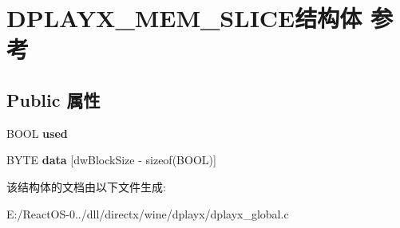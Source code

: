 \hypertarget{struct_d_p_l_a_y_x___m_e_m___s_l_i_c_e}{}\section{D\+P\+L\+A\+Y\+X\+\_\+\+M\+E\+M\+\_\+\+S\+L\+I\+C\+E结构体 参考}
\label{struct_d_p_l_a_y_x___m_e_m___s_l_i_c_e}
\subsection*{Public 属性}
\begin{DoxyCompactItemize}
\item 
\mbox{\label{struct_d_p_l_a_y_x___m_e_m___s_l_i_c_e_acb4ccc1af3c434f08655496d4c706907}} 
B\+O\+OL {\bfseries used}
\item 
\mbox{\label{struct_d_p_l_a_y_x___m_e_m___s_l_i_c_e_a71a609c6d62efcb2426b8821a2e01ed6}} 
B\+Y\+TE {\bfseries data} \mbox{[}dw\+Block\+Size -\/ sizeof(B\+O\+OL)\mbox{]}
\end{DoxyCompactItemize}


该结构体的文档由以下文件生成\+:\begin{DoxyCompactItemize}
\item 
E\+:/\+React\+O\+S-\/0../dll/directx/wine/dplayx/dplayx\+\_\+global.\+c\end{DoxyCompactItemize}

